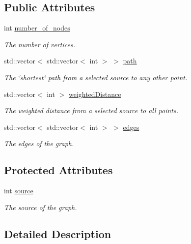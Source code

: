 \subsection*{Public Attributes}
\begin{DoxyCompactItemize}
\item 
int \hyperlink{classMackey_1_1Graph_a6b275a20b0571d4b51fbfa3e596cd67a}{number\+\_\+of\+\_\+nodes}
\begin{DoxyCompactList}\small\item\em The number of vertices. \end{DoxyCompactList}\item 
std\+::vector$<$ std\+::vector$<$ int $>$ $>$ \hyperlink{classMackey_1_1Graph_a66fac95e623ca6e3e85ec33310755831}{path}
\begin{DoxyCompactList}\small\item\em The \char`\"{}shortest\char`\"{} path from a selected source to any other point. \end{DoxyCompactList}\item 
std\+::vector$<$ int $>$ \hyperlink{classMackey_1_1Graph_ab14d4c1bcbe1a994d28a6c590b27ba8b}{weighted\+Distance}
\begin{DoxyCompactList}\small\item\em The weighted distance from a selected source to all points. \end{DoxyCompactList}\item 
std\+::vector$<$ std\+::vector$<$ int $>$ $>$ \hyperlink{classMackey_1_1Graph_a729ec24b9f9e504f4c4e2d3f6e2cab83}{edges}
\begin{DoxyCompactList}\small\item\em The edges of the graph. \end{DoxyCompactList}\end{DoxyCompactItemize}
\subsection*{Protected Attributes}
\begin{DoxyCompactItemize}
\item 
int \hyperlink{classMackey_1_1Graph_a43657a07a21a2dcf422876400360ed5b}{source}
\begin{DoxyCompactList}\small\item\em The source of the graph. \end{DoxyCompactList}\end{DoxyCompactItemize}


\subsection{Detailed Description}
